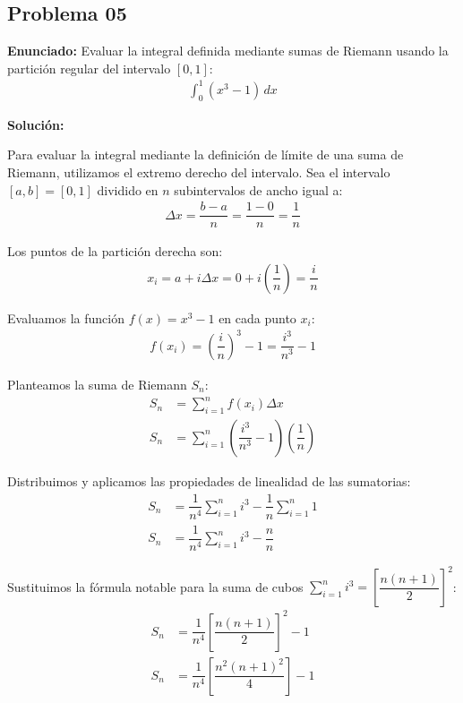 \subsection*{Problema 05}

\textbf{Enunciado:} Evaluar la integral definida 
mediante sumas de Riemann usando la partición 
regular del intervalo $[0, 1]$:
\begin{align*}
\int_{0}^{1} (x^3 - 1) \, dx
\end{align*}

\textbf{Solución:} 

Para evaluar la integral mediante la definición 
de límite de una suma de Riemann, utilizamos 
el extremo derecho del intervalo. Sea el 
intervalo $[a, b] = [0, 1]$ dividido en $n$ 
subintervalos de ancho igual a:
\begin{align*}
\Delta x = \dfrac{b - a}{n} = \dfrac{1 - 0}{n} = \dfrac{1}{n}
\end{align*}

Los puntos de la partición derecha son:
\begin{align*}
x_i = a + i \Delta x = 0 + i \left(\dfrac{1}{n}\right) = \dfrac{i}{n}
\end{align*}

Evaluamos la función $f(x) = x^3 - 1$ en 
cada punto $x_i$:
\begin{align*}
f(x_i) = \left(\dfrac{i}{n}\right)^3 - 1 
= \dfrac{i^3}{n^3} - 1
\end{align*}

Planteamos la suma de Riemann $S_n$:
\begin{align*}
S_n &= \sum_{i=1}^{n} f(x_i) \Delta x \\
S_n &= \sum_{i=1}^{n} \left(\dfrac{i^3}{n^3} - 1\right) \left(\dfrac{1}{n}\right)
\end{align*}

Distribuimos y aplicamos las propiedades 
de linealidad de las sumatorias:
\begin{align*}
S_n &= \dfrac{1}{n^4} \sum_{i=1}^{n} i^3 
- \dfrac{1}{n} \sum_{i=1}^{n} 1 \\
S_n &= \dfrac{1}{n^4} \sum_{i=1}^{n} i^3 - \dfrac{n}{n}
\end{align*}

Sustituimos la fórmula notable para 
la suma de cubos 
$\sum_{i=1}^{n} i^3 = \left[\dfrac{n(n+1)}{2}\right]^2$:
\begin{align*}
S_n &= \dfrac{1}{n^4} \left[\dfrac{n(n+1)}{2}\right]^2 - 1 \\
S_n &= \dfrac{1}{n^4} \left[\dfrac{n^2(n+1)^2}{4}\right] - 1
\end{align*}

